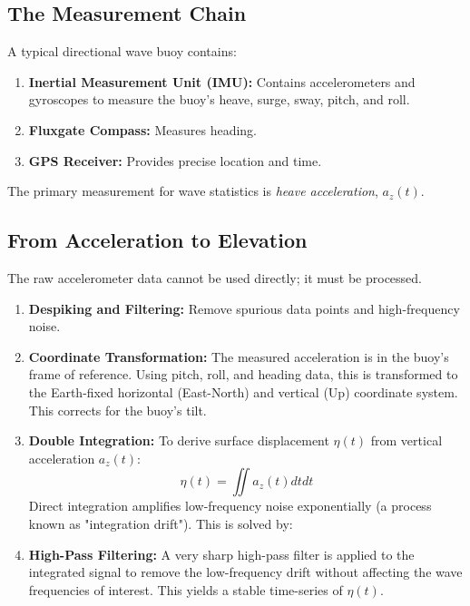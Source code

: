 \documentclass[12pt]{article}
\begin{document}
\subsection{The Measurement Chain}
A typical directional wave buoy contains:
\begin{enumerate}
    \item \textbf{Inertial Measurement Unit (IMU):} Contains accelerometers and gyroscopes to measure the buoy's heave, surge, sway, pitch, and roll.
    \item \textbf{Fluxgate Compass:} Measures heading.
    \item \textbf{GPS Receiver:} Provides precise location and time.
\end{enumerate}
The primary measurement for wave statistics is \textit{heave acceleration}, $a_z(t)$.

\subsection{From Acceleration to Elevation}
The raw accelerometer data cannot be used directly; it must be processed.
\begin{enumerate}
    \item \textbf{Despiking and Filtering:} Remove spurious data points and high-frequency noise.
    \item \textbf{Coordinate Transformation:} The measured acceleration is in the buoy's frame of reference. Using pitch, roll, and heading data, this is transformed to the Earth-fixed horizontal (East-North) and vertical (Up) coordinate system. This corrects for the buoy's tilt.
    \item \textbf{Double Integration:} To derive surface displacement $\eta(t)$ from vertical acceleration $a_z(t)$:
    \begin{equation}
    \eta(t) = \iint a_z(t)  dt  dt
    \end{equation}
    Direct integration amplifies low-frequency noise exponentially (a process known as "integration drift"). This is solved by:
    \item \textbf{High-Pass Filtering:} A very sharp high-pass filter is applied to the integrated signal to remove the low-frequency drift without affecting the wave frequencies of interest. This yields a stable time-series of $\eta(t)$.
\end{enumerate}
\end{document}
